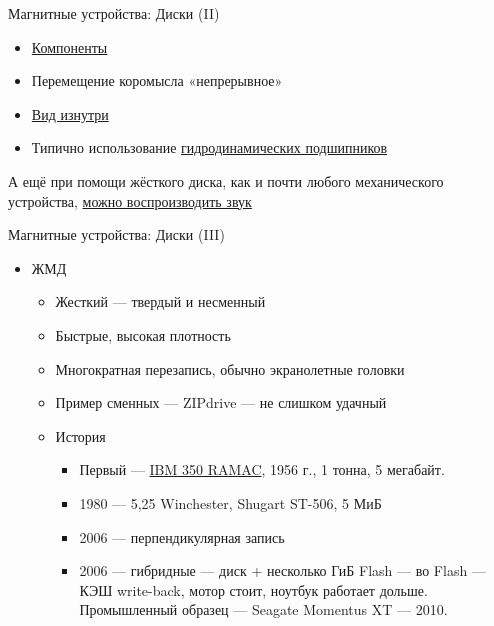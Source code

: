 \documentclass[xetex,aspectratio=43]{beamer}
\begin{document}
\begin{frame}{Магнитные устройства: Диски (II)}

\begin{itemize}
\item
  \href{https://en.wikipedia.org/wiki/Hard_disk_drive\#Components}{Компоненты}
\item Перемещение коромысла «непрерывное»
\item
  \href{https://commons.wikimedia.org/w/index.php?title=File\%3AHardDisk1.ogv}{Вид
  изнутри}
\item
  Типично использование
  \href{https://ru.wikipedia.org/wiki/\%D0\%93\%D0\%B8\%D0\%B4\%D1\%80\%D0\%B0\%D0\%B2\%D0\%BB\%D0\%B8\%D1\%87\%D0\%B5\%D1\%81\%D0\%BA\%D0\%B8\%D0\%B5_\%D0\%B8_\%D0\%BF\%D0\%BD\%D0\%B5\%D0\%B2\%D0\%BC\%D0\%B0\%D1\%82\%D0\%B8\%D1\%87\%D0\%B5\%D1\%81\%D0\%BA\%D0\%B8\%D0\%B5_\%D0\%BF\%D0\%BE\%D0\%B4\%D1\%88\%D0\%B8\%D0\%BF\%D0\%BD\%D0\%B8\%D0\%BA\%D0\%B8}{гидродинамических подшипников}
\end{itemize}

\pause

А ещё при помощи жёсткого диска, как и почти любого механического
устройства, \href{https://youtu.be/pmfHHLfbjNQ}{можно воспроизводить
звук}
\end{frame}

\begin{frame}{Магнитные устройства: Диски (III)}

\begin{itemize}
\tightlist
\item
  ЖМД

  \begin{itemize}
  \tightlist
  \item
    Жесткий --- твердый и несменный
  \item
    Быстрые, высокая плотность
  \item
    Многократная перезапись, обычно экранолетные головки
  \item
    Пример сменных --- ZIPdrive --- не слишком удачный
  \item
    История

    \begin{itemize}
    \tightlist
    \item
      Первый --- \href{https://en.wikipedia.org/wiki/IBM_305_RAMAC}{IBM
      350 RAMAC}, 1956 г., 1 тонна, 5 мегабайт.
    \item
      1980 --- 5,25 Winchester, Shugart ST-506, 5 МиБ
    \item
      2006 --- перпендикулярная запись
    \item
      2006 --- гибридные --- диск + несколько ГиБ Flash --- во Flash ---
      КЭШ write-back, мотор стоит, ноутбук работает дольше. Промышленный
      образец --- Seagate Momentus XT --- 2010.
    \end{itemize}
  \end{itemize}
\end{itemize}
\end{frame}
\end{document}
